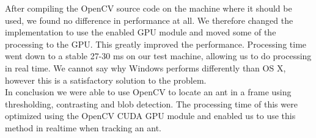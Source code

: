 After compiling the OpenCV source code on the machine where it should be used, we found no difference in performance at all. We therefore changed the implementation to use the enabled GPU module and moved some of the processing to the GPU. This greatly improved the performance. Processing time went down to a stable 27-30 ms on our test machine, allowing us to do processing in real time. We cannot say why Windows performs differently than OS X, however this is a satisfactory solution to the problem.\\

In conclusion we were able to use OpenCV to locate an ant in a frame using thresholding, contrasting and blob detection. The processing time of this were optimized using the OpenCV CUDA GPU module and enabled us to use this method in realtime when tracking an ant. 